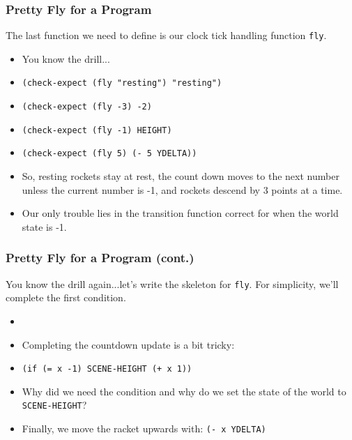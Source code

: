 \documentclass{beamer}
\begin{document}
\begin{frame}
  \frametitle{Pretty Fly for a Program}
  The last function we need to define is our clock tick handling
  function \texttt{fly}.
  \begin{itemize}
  \item<2-> You know the drill...
  \item<3-> \texttt{(check-expect (fly "resting") "resting")}
  \item<4-> \texttt{(check-expect (fly -3) -2)}
  \item<5-> \texttt{(check-expect (fly -1) HEIGHT)}
  \item<6-> \texttt{(check-expect (fly 5) (- 5 YDELTA))}
  \item<7-> So, resting rockets stay at rest, the count down
    moves to the next number unless the current number is -1, and rockets descend by 3 points at a time.
  \item<8-> Our only trouble lies in the transition function correct
    for when the world state is -1.
  \end{itemize}
\end{frame}


\begin{frame}
  \frametitle{Pretty Fly for a Program (cont.)}
  You know the drill again...let's write the skeleton for
  \texttt{fly}. For simplicity, we'll complete the
  first condition.
  \begin{itemize}
  \item<2-> \flySkeleton
  \item<3-> Completing the countdown update is a bit tricky:
  \item<4-> \texttt{(if (= x -1) SCENE-HEIGHT (+ x 1))}
  \item<5-> Why did we need the condition and why do we set
    the state of the world to \texttt{SCENE-HEIGHT}?
  \item<6-> Finally, we move the racket upwards with:
    \texttt{(- x YDELTA)}
  \end{itemize}  
\end{frame}

\end{document}
